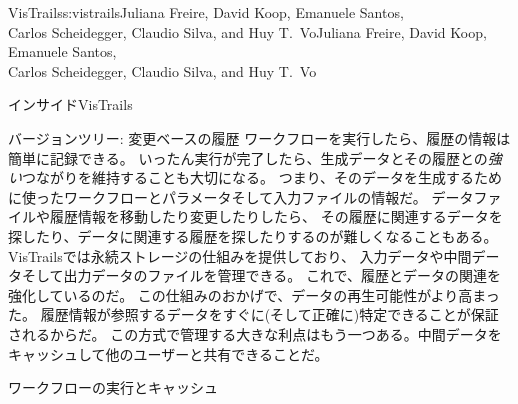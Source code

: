 \begin{aosachaptertoc}{VisTrails}{s:vistrails}{Juliana Freire, David Koop, Emanuele Santos, \\ Carlos Scheidegger, Claudio Silva, and Huy T.\ Vo}{Juliana Freire, David Koop, Emanuele Santos, \\ \hspace*{0.9cm} Carlos Scheidegger, Claudio Silva, and Huy T.\ Vo}
\begin{aosasect1}{インサイドVisTrails}
\begin{aosasect2}{バージョンツリー: 変更ベースの履歴}
ワークフローを実行したら、履歴の情報は簡単に記録できる。
いったん実行が完了したら、生成データとその履歴との\emph{強い}つながりを維持することも大切になる。
つまり、そのデータを生成するために使ったワークフローとパラメータそして入力ファイルの情報だ。
データファイルや履歴情報を移動したり変更したりしたら、
その履歴に関連するデータを探したり、データに関連する履歴を探したりするのが難しくなることもある。
VisTrailsでは永続ストレージの仕組みを提供しており、
入力データや中間データそして出力データのファイルを管理できる。
これで、履歴とデータの関連を強化しているのだ。
この仕組みのおかげで、データの再生可能性がより高まった。
履歴情報が参照するデータをすぐに(そして正確に)特定できることが保証されるからだ。
この方式で管理する大きな利点はもう一つある。中間データをキャッシュして他のユーザーと共有できることだ。

\end{aosasect2}

\begin{aosasect2}{ワークフローの実行とキャッシュ}
\label{sec.vistrails.exec-cache}


\end{aosasect2}
\end{aosasect1}
\end{aosachaptertoc}
